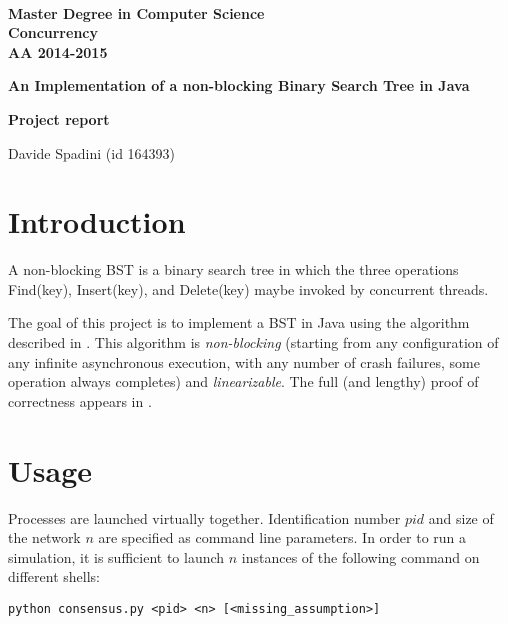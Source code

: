 \documentclass[a4paper]{article}
\begin{document}
\begin{centering}
~~~~~~~~~~~~~\\[-20mm]

  {
  \bfseries Master Degree in Computer Science\\[3mm]
  Concurrency\\[3mm]
  AA 2014-2015
  }\\[1mm]


  \vspace{0.5cm}
  {
  \Large \bfseries{An Implementation of a non-blocking Binary Search Tree in Java} \par
  }
  \vspace{0.2cm}
  {
  \small \bfseries{Project report} \par
  }
  \vspace{0.2cm}

  {Davide Spadini (id 164393)}

  \vspace{0.3cm}
\end{centering}



\section{Introduction}\label{introduction}
A non-blocking \ac{BST} is a binary search tree in which the three operations Find(key), Insert(key), and Delete(key) maybe invoked by concurrent threads.

The goal of this project is to implement a \ac{BST} in Java using the algorithm described in \cite{algorithm}. 
This algorithm is \emph{non-blocking} (starting from any configuration of any infinite asynchronous execution, with any number of crash failures, some operation always completes) and \emph{linearizable}. The full (and lengthy) proof of correctness appears in \cite{proof}.

\section{Usage} %
\label{sec:usage}

Processes are launched virtually together. Identification number $pid$ and size of the network $n$ are specified as command line parameters. In order to run a simulation, it is sufficient to launch $n$ instances of the following command on different shells:

\verb|python consensus.py <pid> <n> [<missing_assumption>]|
\\
\end{document}
